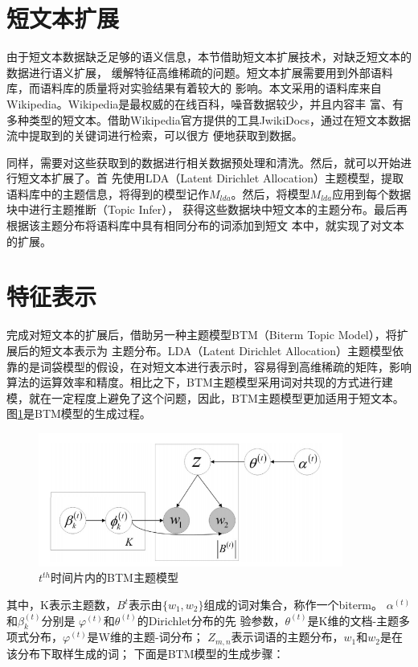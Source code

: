\section{短文本扩展}
由于短文本数据缺乏足够的语义信息，本节借助短文本扩展技术，对缺乏短文本的数据进行语义扩展，
缓解特征高维稀疏的问题。短文本扩展需要用到外部语料库，而语料库的质量将对实验结果有着较大的
影响。本文采用的语料库来自Wikipedia。Wikipedia是最权威的在线百科，噪音数据较少，并且内容丰
富、有多种类型的短文本。借助Wikipedia官方提供的工具JwikiDocs，通过在短文本数据流中提取到的关键词进行检索，可以很方
便地获取到数据。

同样，需要对这些获取到的数据进行相关数据预处理和清洗。然后，就可以开始进行短文本扩展了。首
先使用LDA（Latent Dirichlet Allocation）主题模型，提取语料库中的主题信息，将得到的模型记作$M_{lda}$。然后，将模型$M_{lda}$应用到每个数据块中进行主题推断（Topic Infer）\cite{phan2010hidden}，
获得这些数据块中短文本的主题分布。最后再根据该主题分布将语料库中具有相同分布的词添加到短文
本中，就实现了对文本的扩展。

\section{特征表示}
完成对短文本的扩展后，借助另一种主题模型BTM（Biterm Topic Model），将扩展后的短文本表示为
主题分布。LDA（Latent Dirichlet Allocation）主题模型依
靠的是词袋模型的假设，在对短文本进行表示时，容易得到高维稀疏的矩阵，影响算法的运算效率和精度。相比之下，BTM主题模型采用词对共现的方式进行建模，就在一定程度上避免了这个问题，因此，BTM主题模型更加适用于短文本。图\ref{fig:btm}是BTM模型的生成过程。

\begin{figure}[ht]
  \centering
  \includegraphics[width=10cm]{./figs/btm.png}
  \caption{$t^{th}$时间片内的BTM主题模型}
  \label{fig:btm}
\end{figure}

其中，K表示主题数，$B^{t}$表示由$\{w_1,w_2\}$组成的词对集合，称作一个biterm。
$\alpha^{(t)}$和$\beta_{k}^{(t)}$分别是 $\varphi^{(t)}$和$\theta^{(t)}$的Dirichlet分布的先
验参数，$\theta^{(t)}$是K维的文档-主题多项式分布，$\varphi^{(t)}$是W维的主题-词分布； $Z_{m,n}$表示词语的主题分布，$w_1$和$w_2$是在该分布下取样生成的词；
下面是BTM模型的生成步骤：
 
